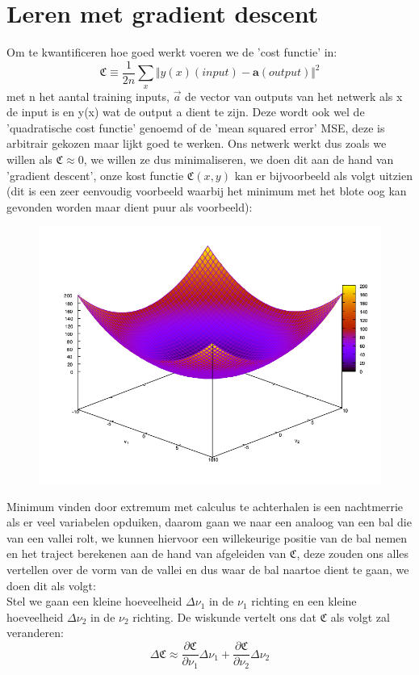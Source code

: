 \documentclass[10pt,a4paper,twoside]{article}
\begin{document}
\section{Leren met gradient descent}
Om te kwantificeren hoe goed  werkt voeren we de 'cost functie' in:
\begin{equation*}
\mathfrak{C} \equiv \frac{1}{2n}\sum_{x}^{}\Vert y(x)(input)-\mathbf{a}(output) \Vert ^2
\label{kostfunctie}
\end{equation*}
met n het aantal training inputs, $\vec{a}$ de vector van outputs van het netwerk als x de input is en y(x) wat de output a dient te zijn. Deze wordt ook wel de 'quadratische cost functie' genoemd of de 'mean squared error' MSE, deze is arbitrair gekozen maar lijkt goed te werken. Ons netwerk werkt dus zoals we willen als $\mathfrak{C} \approx 0$, we willen ze dus minimaliseren, we doen dit aan de hand van 'gradient descent', onze kost functie $\mathfrak{C}(x,y)$ kan er bijvoorbeeld als volgt uitzien (dit is een zeer eenvoudig voorbeeld waarbij het minimum met het blote oog kan gevonden worden maar dient puur als voorbeeld):
\begin{figure}[H]
	\centering
	\includegraphics[width=0.5\linewidth]{cost_function}
\end{figure}
Minimum vinden door extremum met calculus te achterhalen is een nachtmerrie als er veel variabelen opduiken, daarom gaan we naar een analoog van een bal die van een vallei rolt, we kunnen hiervoor een willekeurige positie van de bal nemen en het traject berekenen aan de hand van afgeleiden van $\mathfrak{C}$, deze zouden ons alles vertellen over de vorm van de vallei en dus waar de bal naartoe dient te gaan, we doen dit als volgt:\\
Stel we gaan een kleine hoeveelheid $\Delta \nu_1$ in de $\nu_1$ richting en een kleine hoeveelheid $\Delta \nu_2$ in de $\nu_2$ richting. De wiskunde vertelt ons dat $\mathfrak{C}$ als volgt zal veranderen:
\begin{equation}
	\Delta \mathfrak{C} \approx \frac{\partial \mathfrak{C}}{\partial \nu_1}\Delta \nu_1 + \frac{\partial \mathfrak{C}}{\partial \nu_2}\Delta \nu_2
\end{equation}
\end{document}
